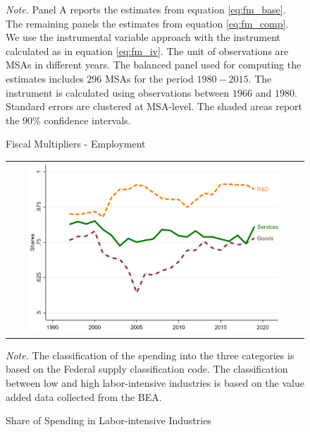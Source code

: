 \documentclass[dv_diss_main.tex]{subfiles}
\begin{document}
\begin{figure}[H]
\begin{center}
\begin{tabular}[c]{ccc}
    \end{tabular}
    \caption{Fiscal Multipliers - Employment}
    \end{center}
    
    \footnotesize{\textit{Note. } Panel A reports the estimates from equation \eqref{eq:fm_base}. The remaining panels the estimates from equation \eqref{eq:fm_comp}. We use the instrumental variable approach with the instrument calculated as in equation \eqref{eq:fm_iv}. The unit of observations are MSAs in different years. The balanced panel used for computing the estimates includes $296$ MSAs for the period $1980-2015$. The instrument is calculated using observations between $1966$ and $1980$. Standard errors are clustered at MSA-level. The shaded areas report the $90\%$ confidence intervals.}
    \label{fig:fm_employment}
\end{figure}
\newpage

\begin{figure}[H]
    \begin{center}
        \begin{tabular}[c]{c}
   
    {\includegraphics[height=2.5in,width=4.5in]{figures/graph_share_laborintensity.png}} \\[0.1in]

    
    \end{tabular}
    \caption{Share of Spending in Labor-intensive Industries}
    \end{center}
    
    
    \footnotesize{\textit{Note. } The classification of the spending into the three categories is based on the Federal supply classification code. The classification between low and high labor-intensive industries is based on the value added data collected from the BEA.}
    \label{fig:shlabint_comp}
\end{figure}
\newpage
\end{document}
